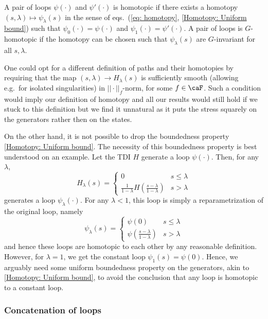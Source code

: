 \begin{definition}
	A pair of loops $\psi(\cdot)$ and $\psi'(\cdot)$ is homotopic if there exists a homotopy $(s,\lambda)\mapsto \psi_\lambda(s)$ in the sense of eqs.\ (\ref{eq: homotopy}, \ref{Homotopy: Uniform bound}) such that $\psi_0(\cdot)=\psi(\cdot)$ and $\psi_1(\cdot)=\psi'(\cdot)$.   
	A pair of loops is $G$-homotopic if the homotopy can be chosen such that $ \psi_\lambda(s)$ are $G$-invariant  for all $s,\lambda$.   
\end{definition}  


One could opt for a different definition of paths and their homotopies by requiring that the map $(s,\lambda)\to H_\lambda(s)$ is sufficiently smooth (allowing e.g.\ for isolated singularities) in $||\cdot||_f$-norm, for some $f\in\caF$. Such a condition would imply our definition of homotopy and all our results would still hold if we stuck to this definition but we find it unnatural as it puts the stress squarely on the generators rather then on the states.


On the other hand, it is not possible to drop the boundedness property \eqref{Homotopy: Uniform bound}. The necessity of this boundedness property is best understood on an example. Let the TDI $H$ generate a loop $\psi(\cdot)$. Then, for any $\lambda$, 
$$
H_\lambda(s)= \begin{cases} 0  &  s\leq \lambda \\
\tfrac{1}{1-\lambda} H(\tfrac{s-\lambda}{1-\lambda})&  s>\lambda
\end{cases}
$$ 
generates a loop  $\psi_\lambda(\cdot)$. 
For any $\lambda<1$, this loop is simply a reparametrization of the original loop, namely 
$$
\psi_\lambda(s)= \begin{cases} \psi(0)  &  s\leq \lambda \\
\psi( \tfrac{s-\lambda}{1-\lambda})  &  s>\lambda
\end{cases}
$$ 
and hence these loops are homotopic to each other by any reasonable definition. However, for $\lambda=1$, we get the constant loop $\psi_1(s)=\psi(0)$. Hence, we arguably need some uniform boundedness property on the generators, akin to \eqref{Homotopy: Uniform bound}, to avoid the conclusion that any loop is homotopic to a constant loop. 


\subsubsection{Concatenation of loops} \label{sec: concatenation loops}


